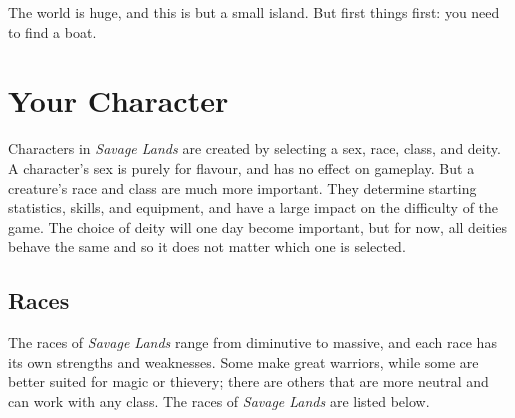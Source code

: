\documentclass{article}
\begin{document}
The world is huge, and this is but a small island.  But first things first:
you need to find a boat.

\section{Your Character}

Characters in {\it Savage Lands} are created by selecting a sex, race,
class, and deity.  A character's sex is purely for flavour, and has no 
effect on gameplay.  But a creature's race and class are much more 
important.  They determine starting statistics, skills, and equipment, and 
have a large impact on the difficulty of the game.  The choice of deity
will one day become important, but for now, all deities behave the same and
so it does not matter which one is selected.

\subsection{Races}

The races of {\it Savage Lands} range from diminutive to massive, and each
race has its own strengths and weaknesses.  Some make great warriors, 
while some are better suited for magic or thievery; there are others that
are more neutral and can work with any class.  The races of {\it Savage
Lands} are listed below.
\end{document}
